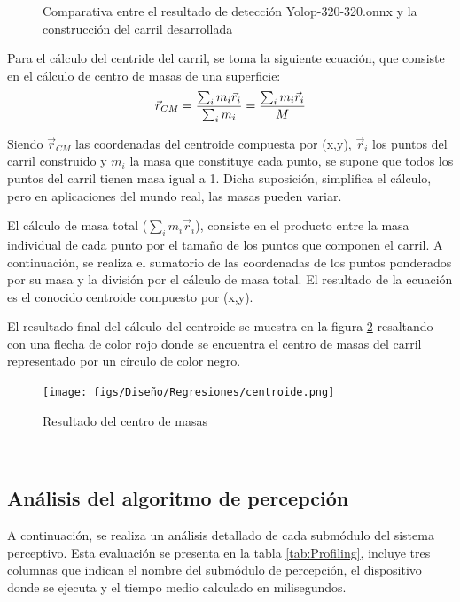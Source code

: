\begin{figure}[H]
  \caption{Comparativa entre el resultado de detección Yolop-320-320.onnx y la construcción del carril desarrollada}
  \label{comparativa-interpolacion}
\end{figure}

Para el cálculo del centride del carril, se toma la siguiente ecuación, que consiste en el cálculo de centro de masas de una superficie: \newline
  \begin{equation} 
    \vec{r}_{CM} = \frac{\sum_{i}m_{i} \vec{r}_{i}}{\sum_{i}m_{i}} = \frac{\sum_{i}m_{i} \vec{r}_{i}}{M} 
    \newline
    \label{eq:funcioncentromasas}
  \end{equation} 

  Siendo $\vec{r}_{CM}$ las coordenadas del centroide compuesta por (x,y), $\vec{r}_{i}$ los puntos del carril construido y $m_{i}$ la masa que constituye cada punto, se supone que todos 
  los puntos del carril tienen masa igual a 1. Dicha suposición, simplifica el cálculo, pero en aplicaciones del mundo real, las masas pueden variar. 

  El cálculo de masa total ($\sum_{i}m_{i} \vec{r}_{i}$), consiste en el producto entre la masa individual de cada punto por el tamaño de los puntos que componen el carril. A continuación, 
  se realiza el sumatorio de las coordenadas de los puntos ponderados por su masa y la división por el cálculo de masa total. El resultado de la ecuación es el conocido centroide 
  compuesto por (x,y). \newline
  
  El resultado final del cálculo del centroide se muestra en la figura \ref{fig:centro de masas} resaltando con una flecha de color rojo donde se encuentra
  el centro de masas del carril representado por un círculo de color negro.

  \begin{figure} [H]
    \begin{center}
      \texttt{[image: figs/Diseño/Regresiones/centroide.png]}
    \end{center}
    \caption{Resultado del centro de masas}
    \label{fig:centro de masas}
  \end{figure}\

  \subsection{Análisis del algoritmo de percepción}
  \label{sec:Análisis del algoritmo de percepción}
  A continuación, se realiza un análisis detallado de cada submódulo del sistema perceptivo. Esta evaluación se presenta en la tabla \ref{tab:Profiling}, incluye 
  tres columnas que indican el nombre del submódulo de percepción, el dispositivo donde se ejecuta y el tiempo medio calculado en milisegundos.

